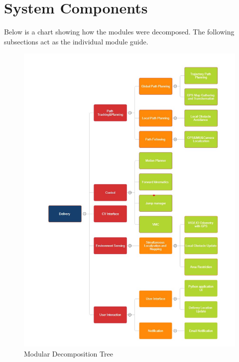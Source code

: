 \documentclass[12pt]{article}
\begin{document}
\section{System Components}
    Below is a chart showing how the modules were decomposed. The following subsections act as the individual module guide.
    \begin{figure}[H]
        \centering
        \includegraphics[width=\textwidth,height=\textheight,keepaspectratio]{../Decomp_Tree.jpg}
        \caption{Modular Decomposition Tree}
    \end{figure}
    
\end{document}
